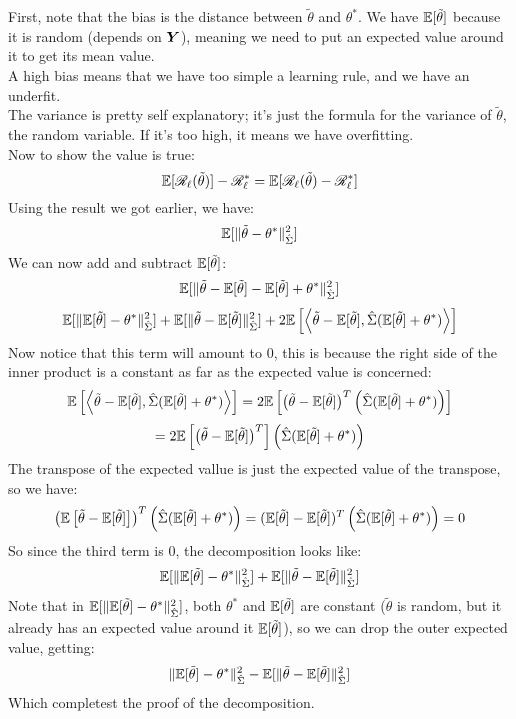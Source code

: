 \documentclass[12pt]{article}
\begin{document}
First, note that the bias is the 
distance between $\tilde{\theta}$
and $\theta^*$.
We have $\mathbb{E}[\tilde{\theta}]$
because it is random (depends on $\boldsymbol{Y}$),
meaning we need to put an expected value
around it to get its mean value. \\
A high bias means that we have too simple a
learning rule, and we have an underfit.\\

The variance is pretty self explanatory;
it's just the formula for the variance
of $\tilde{\theta}$, the random variable.
If it's too high, it means we have overfitting. \\

Now to show the value is true:
\[ \mathbb{E}[\mathscr{R}_{\ell}(\tilde{\theta})] 
- \mathscr{R}_{\ell}^*
= \mathbb{E}[\mathscr{R}_{\ell}(\tilde{\theta}) - \mathscr{R}_{\ell}^*] \]
Using the result we got earlier, we have:
\[ \mathbb{E}[\|\tilde{\theta} - \theta^* \|_{\hat{\Sigma}}^2] \]
We can now add and subtract $\mathbb{E}[\tilde{\theta}]$:
\[\mathbb{E}[\|\tilde{\theta} - \mathbb{E}[\tilde{\theta}]
- \mathbb{E}[\tilde{\theta}] + \theta^* \|_{\hat{\Sigma}}^2] \]
\[ \mathbb{E}[\|\mathbb{E}[\tilde{\theta}] - \theta^* \|_{\hat{\Sigma}}^2]
+ \mathbb{E}[\|\tilde{\theta} - \mathbb{E}[\tilde{\theta}] \|_{\hat{\Sigma}}^2]
+ 2\mathbb{E}\left[ \left\langle \tilde{\theta} - \mathbb{E}[\tilde{\theta}],
\hat{\Sigma}(\mathbb{E}[\tilde{\theta}] + \theta^*) \right\rangle \right] \]
Now notice that this term will amount to $0$,
this is because the right side of the inner
product is a constant as far as the expected
value is concerned:
\[ \mathbb{E}\left[ \left\langle \tilde{\theta} - \mathbb{E}[\tilde{\theta}],
\hat{\Sigma}(\mathbb{E}[\tilde{\theta}] + \theta^*) \right\rangle \right] 
= 2\mathbb{E}\left[ \left( \tilde{\theta} - \mathbb{E}[\tilde{\theta}] \right)^T
\left( \hat{\Sigma}(\mathbb{E}[\tilde{\theta}] + \theta^*) \right) \right] \]
\[ = 2\mathbb{E}\left[ \left( \tilde{\theta} - \mathbb{E}[\tilde{\theta}] \right)^T \right]
\left( \hat{\Sigma}(\mathbb{E}[\tilde{\theta}] + \theta^*) \right) \]
The transpose of the expected vallue is just
the expected value of the transpose, so we have:
\[ \left( \mathbb{E}\left[ \tilde{\theta} - \mathbb{E}[\tilde{\theta}] \right] \right)^T
\left( \hat{\Sigma}(\mathbb{E}[\tilde{\theta}] + \theta^*) \right) 
=(\mathbb{E}[\tilde{\theta}] - \mathbb{E}[\tilde{\theta}])^T
\left( \hat{\Sigma}(\mathbb{E}[\tilde{\theta}] + \theta^*) \right) = 0 \]
So since the third term is $0$, the decomposition
looks like:
\[ \mathbb{E}[\|\mathbb{E}[\tilde{\theta}] - \theta^* 
\|_{\hat{\Sigma}}^2]
+ \mathbb{E}[\|\tilde{\theta} - \mathbb{E}[\tilde{\theta}] 
\|_{\hat{\Sigma}}^2] \]
Note that in $\mathbb{E}[\|\mathbb{E}[\tilde{\theta}] 
- \theta^* \|_{\hat{\Sigma}}^2]$,
both $\theta^*$ and $\mathbb{E}[\tilde{\theta}]$
are constant ($\tilde{\theta}$ is random,
but it already has an expected value around it
$\mathbb{E}[\tilde{\theta}]$),
so we can drop the outer expected value, getting:
\[ \|\mathbb{E}[\tilde{\theta}] - \theta^* \|_{\hat{\Sigma}}^2
-\mathbb{E}[\|\tilde{\theta} - \mathbb{E}[\tilde{\theta}] \|_{\hat{\Sigma}}^2 ] \]
Which completest the proof of the decomposition. \\
\end{document}
